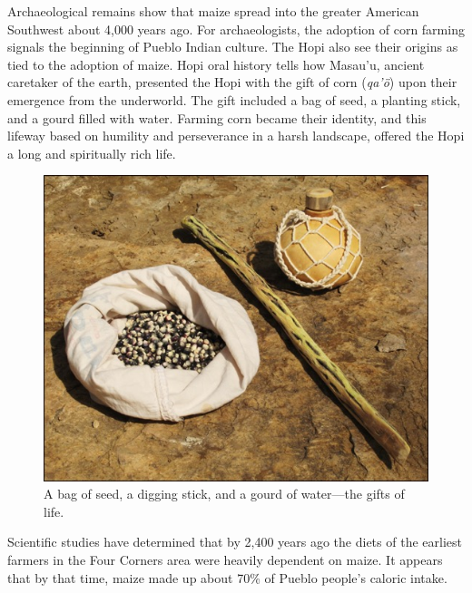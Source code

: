 \documentclass[12pt,]{article}
\begin{document}
Archaeological remains show that maize spread into the greater American Southwest about 4,000 years ago. For archaeologists, the adoption of corn farming signals the beginning of Pueblo Indian culture. The Hopi also see their origins as tied to the adoption of maize. Hopi oral history tells how Masau'u, ancient caretaker of the earth, presented the Hopi with the gift of corn (\emph{qa'ö}) upon their emergence from the underworld. The gift included a bag of seed, a planting stick, and a gourd filled with water. Farming corn became their identity, and this lifeway based on humility and perseverance in a harsh landscape, offered the Hopi a long and spiritually rich life.

\begin{figure}
\centering
\includegraphics{./images/gifts_of_life.jpg}
\caption{A bag of seed, a digging stick, and a gourd of water---the gifts of life.}
\end{figure}

Scientific studies have determined that by 2,400 years ago the diets of the earliest farmers in the Four Corners area were heavily dependent on maize. It appears that by that time, maize made up about 70\% of Pueblo people's caloric intake.
\end{document}
